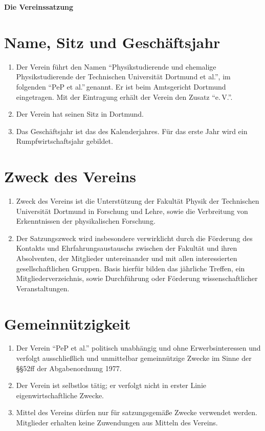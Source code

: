 \documentclass[
  fontsize=12pt,
  paper=a4,
  DIV14,
  parskip,
]{scrartcl}
\begin{document}
\textbf{\huge Die Vereinssatzung}

\section{Name, Sitz und Geschäftsjahr}

\begin{enumerate}
  \item Der Verein führt den Namen \enquote{Physikstudierende und ehemalige
    Physikstudierende der Technischen Universität Dortmund et al.}, im
    folgenden \enquote{PeP et al.}$\,$genannt. Er ist beim Amtsgericht
		Dortmund eingetragen. Mit der Eintragung erhält der Verein den Zusatz
    \enquote{e.\,V.}.
	\item Der Verein hat seinen Sitz in Dortmund.
	\item Das Geschäftsjahr ist das des Kalenderjahres. Für das erste Jahr wird
		ein Rumpfwirtschaftsjahr gebildet.
\end{enumerate}

\section{Zweck des Vereins}

\begin{enumerate}
	\item Zweck des Vereins ist die Unterstützung der Fakultät Physik der
		Technischen Universität Dortmund in Forschung und Lehre, sowie die
		Verbreitung von Erkenntnissen der physikalischen Forschung.
	\item Der Satzungszweck wird insbesondere verwirklicht durch die Förderung
		des Kontakts und Ehrfahrungsaustauschs zwischen der Fakultät und ihren
		Absolventen, der Mitglieder untereinander und mit allen interessierten
		gesellschaftlichen Gruppen. Basis hierfür bilden das jährliche Treffen,
		ein Mitgliederverzeichnis, sowie Durchführung oder Förderung
		wissenschaftlicher Veranstaltungen.
\end{enumerate}

\section{Gemeinnützigkeit}

\begin{enumerate}
	\item Der Verein \enquote{PeP et al.} politisch unabhängig und ohne
		Erwerbsinteressen und verfolgt ausschließlich und unmittelbar gemeinnützige
		Zwecke im Sinne der §§52ff der Abgabenordnung 1977.
	\item Der Verein ist selbstlos tätig; er verfolgt nicht in erster Linie
		eigenwirtschaftliche Zwecke.
	\item Mittel des Vereins dürfen nur für satzungsgemäße Zwecke verwendet
		werden. Mitglieder erhalten keine Zuwendungen aus Mitteln des Vereins.
\end{enumerate}
\end{document}

